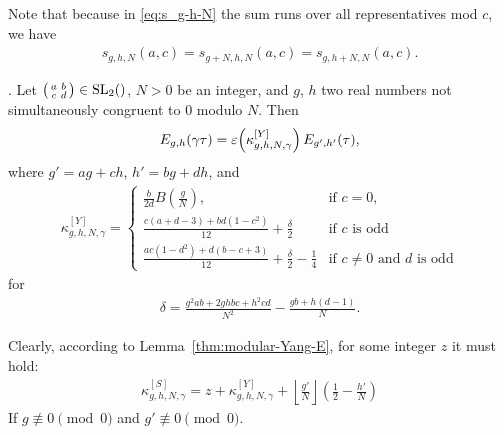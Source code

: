 \documentclass{article}
\begin{document}
Note that because in \eqref{eq:s_g-h-N} the sum runs over all
representatives mod $c$, we have
\begin{gather*}
  s_{g,h,N}(a,c)=s_{g+N,h,N}(a,c)=s_{g,h+N,N}(a,c).
\end{gather*}



\begin{Lemma}[Yang]
  \cite[Theorem~1]{Yang:GeneralizedDedekindEtaFunctions:2004}.
  \label{thm:Generalized-Eta-Transformation-Yang}
  Let
  $\left(\begin{smallmatrix}a&b\\c&d\end{smallmatrix}\right) \in
  \SL2Z$, $N>0$ be an integer, and $g$, $h$ two real numbers not
  simultaneously congruent to 0 modulo $N$.
  Then
  \begin{gather}
    E_{g,h}(\gamma\tau)
    =
    \varepsilon\!\left(\kappa_{g,h,N,\gamma}^{[Y]}\right)E_{g',h'}(\tau),
  \end{gather}
  where $g'=ag+ch$, $h'=bg+dh$, and
  \begin{gather}
    \kappa_{g,h,N,\gamma}^{[Y]}
    =
    \begin{cases}
      \frac{b}{2d} B(\frac{g}{N}), &\text{if $c=0$},
      \\
      \frac{c (a+d-3) + b d (1 - c^2)}{12} + \frac{\delta}{2}
      &
      \text{if $c$ is odd}
      \\
      \frac{a c (1 - d^2) + d (b - c + 3)}{12} + \frac{\delta}{2} - \frac{1}{4}
      &
      \text{if $c\not=0$ and $d$ is odd}
    \end{cases}
  \end{gather}
  for
  \begin{gather}
    \delta = \frac{g^2 a b + 2 g h b c + h^2 c d}{N^2}
             - \frac{g b + h (d-1)}{N}.
  \end{gather}
\end{Lemma}

Clearly, according to Lemma~\ref{thm:modular-Yang-E}, for some integer
$z$ it must hold:
\begin{gather*}
  \kappa_{g,h,N,\gamma}^{[S]}
  =
  z + \kappa_{g,h,N,\gamma}^{[Y]}
    + \left\lfloor\frac{g'}{N} \right\rfloor
      \left(\frac{1}{2} - \frac{h'}{N}\right)
\end{gather*}
If $g\not\equiv0\pmod{0}$ and $g'\not\equiv0\pmod{0}$.
\end{document}
